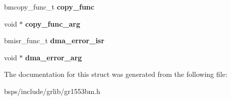 \begin{DoxyCompactItemize}
bmcopy\+\_\+func\+\_\+t {\bfseries copy\+\_\+func}
\item 
\mbox{\label{structgr1553bm__config_a8f816132a35db77d046025eee4cf6f40}} 
void $\ast$ {\bfseries copy\+\_\+func\+\_\+arg}
\item 
\mbox{\label{structgr1553bm__config_af546baed5f2e3cb35d39fc3b58faa5d9}} 
bmisr\+\_\+func\+\_\+t {\bfseries dma\+\_\+error\+\_\+isr}
\item 
\mbox{\label{structgr1553bm__config_a16952e57bf4db506ffaf695aed3ce2e5}} 
void $\ast$ {\bfseries dma\+\_\+error\+\_\+arg}
\end{DoxyCompactItemize}


The documentation for this struct was generated from the following file\+:\begin{DoxyCompactItemize}
\item 
bsps/include/grlib/gr1553bm.\+h\end{DoxyCompactItemize}
